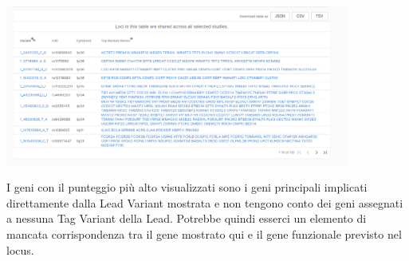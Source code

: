 \documentclass{article}
\begin{document}
\begin{center}
    \includegraphics[width=0.85\textwidth]{figures/8-Compare Studies.png}
\end{center}
I geni con il punteggio più alto visualizzati sono i geni principali implicati direttamente dalla Lead Variant mostrata e non tengono conto dei geni assegnati a nessuna Tag Variant della Lead. Potrebbe quindi esserci un elemento di mancata corrispondenza tra il gene mostrato qui e il gene funzionale previsto nel locus.
\end{document}
